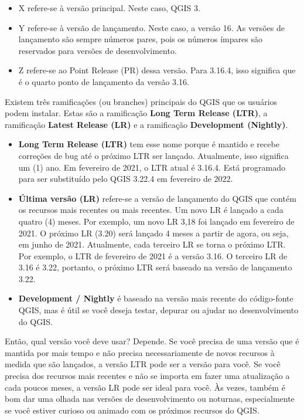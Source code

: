 \documentclass[
]{book}
\providecommand{\tightlist}{%
  \setlength{\itemsep}{0pt}\setlength{\parskip}{0pt}}
\begin{document}
\begin{itemize}
\tightlist
\item
  X refere-se à versão principal. Neste caso, QGIS 3.
\item
  Y refere-se à versão de lançamento. Neste caso, a versão 16. As versões de lançamento são sempre números pares, pois os números ímpares são reservados para versões de desenvolvimento.
\item
  Z refere-se ao Point Release (PR) dessa versão. Para 3.16.4, isso significa que é o quarto ponto de lançamento da versão 3.16.
\end{itemize}

Existem três ramificações (ou branches) principais do QGIS que os usuários podem instalar. Estas são a ramificação \textbf{Long Term Release (LTR)}, a ramificação \textbf{Latest Release (LR)} e a ramificação \textbf{Development (Nightly)}.

\begin{itemize}
\tightlist
\item
  \textbf{Long Term Release (LTR)} tem esse nome porque é mantido e recebe correções de bug até o próximo LTR ser lançado. Atualmente, isso significa um (1) ano. Em fevereiro de 2021, o LTR atual é 3.16.4. Está programado para ser substituído pelo QGIS 3.22.4 em fevereiro de 2022.
\item
  \textbf{Última versão (LR)} refere-se a versão de lançamento do QGIS que contém os recursos mais recentes ou mais recentes. Um novo LR é lançado a cada quatro (4) meses. Por exemplo, um novo LR 3,18 foi lançado em fevereiro de 2021. O próximo LR (3.20) será lançado 4 meses a partir de agora, ou seja, em junho de 2021. Atualmente, cada terceiro LR se torna o próximo LTR. Por exemplo, o LTR de fevereiro de 2021 é a versão 3.16. O terceiro LR de 3.16 é 3.22, portanto, o próximo LTR será baseado na versão de lançamento 3.22.
\item
  \textbf{Development / Nightly} é baseado na versão mais recente do código-fonte QGIS, mas é útil se você deseja testar, depurar ou ajudar no desenvolvimento do QGIS.
\end{itemize}

Então, qual versão você deve usar? Depende. Se você precisa de uma versão que é mantida por mais tempo e não precisa necessariamente de novos recursos à medida que são lançados, a versão LTR pode ser a versão para você. Se você precisa dos recursos mais recentes e não se importa em fazer uma atualização a cada poucos meses, a versão LR pode ser ideal para você. Às vezes, também é bom dar uma olhada nas versões de desenvolvimento ou noturnas, especialmente se você estiver curioso ou animado com os próximos recursos do QGIS.
\end{document}
